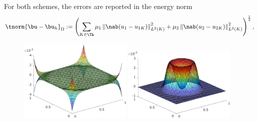 \begin{frame}
 For both schemes, the errors are reported in the energy norm
\begin{equation*}
\tnorm{\bu - \bu_h}_{\Omega} \egaldef \left(\sum_{K\in\Th}\mu_1 \left\|\nab(u_1-u_{1K})  \right\|_{L^2(K)}^2 + \mu_2 \left\|\nab(u_2-u_{2K})  \right\|_{L^2(K)}^2  \right)^{\frac{1}{2}} ,
\end{equation*}
\begin{figure}
\centering
\includegraphics[width=0.48\textwidth]{P2_membrane_cv_J6} \quad
\includegraphics[width=0.48\textwidth]{P2_lambda_cv_J6}
\end{figure}
\end{frame}

